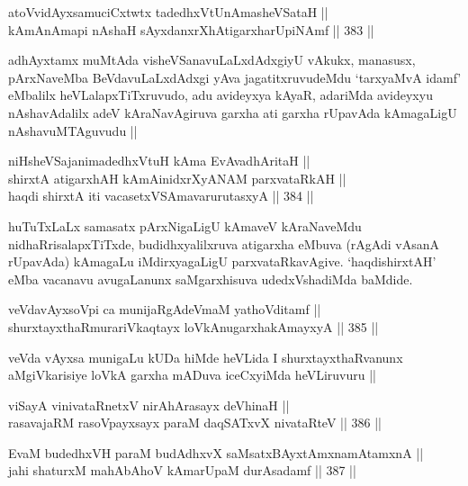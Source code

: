 \begin{shl}
atoV\s vidAyxsamuciCxtwtx tadedhxVtUnAmasheVSataH || \\
kAmAnAmapi nAshaH sAyxdanxrXhAtigarxharUpiNAmf ||  383 ||  
\end{shl}

\begin{artha}
adhAyxtamx muMtAda visheVSanavuLaLxdAdxgiyU vAkukx, manasusx,
pArxNaveMba BeVdavuLaLxdAdxgi yAva jagatitxruvudeMdu `tarxyaMvA idamf'
eMbalilx heVLalapxTiTxruvudo, adu avideyxya kAyaR, adariMda avideyxyu
nAshavAdalilx adeV kAraNavAgiruva garxha ati garxha rUpavAda
kAmagaLigU nAshavuMTAguvudu ||
\end{artha}

\begin{shl}
niHsheVSajanimadedhxVtuH kAma EvAvadhAritaH || \\
shirxtA atigarxhAH kAmAinidxrXyANAM parxvataRkAH || \\
haqdi shirxtA iti vacasetxVSAmavarurutasxyA ||  384 ||  
\end{shl}

\begin{artha}
huTuTxLaLx samasatx pArxNigaLigU kAmaveV kAraNaveMdu
nidhaRrisalapxTiTxde, budidhxyalilxruva atigarxha eMbuva (rAgAdi
vAsanA rUpavAda) kAmagaLu iMdirxyagaLigU
parxvataRkavAgive. `haqdishirxtAH' eMba vacanavu avugaLanunx
saMgarxhisuva udedxVshadiMda baMdide. 
\end{artha}

\begin{shl}
veVdavAyxsoV\s pi ca munijaRgAdeVmaM yathoVditamf || \\
shurxtayxthaRmurariVkaqtayx loVkAnugarxhakAmayxyA ||  385 ||  
\end{shl}

\begin{artha}
veVda vAyxsa munigaLu kUDa hiMde heVLida I shurxtayxthaRvanunx
aMgiVkarisiye loVkA garxha mADuva iceCxyiMda heVLiruvuru ||
\end{artha}


\begin{shl}
viSayA vinivataRnetxV nirAhArasayx deVhinaH || \\
rasavajaRM rasoV\s payxsayx paraM daqSATxvX nivataRteV ||  386 ||  
\end{shl}
				
\begin{shl}
EvaM budedhxVH paraM budAdhxvX saMsatxBAyx\s \s tAmxnamAtamxnA || \\
jahi shaturxM mahAbAhoV kAmarUpaM durAsadamf ||  387 ||  
\end{shl}

